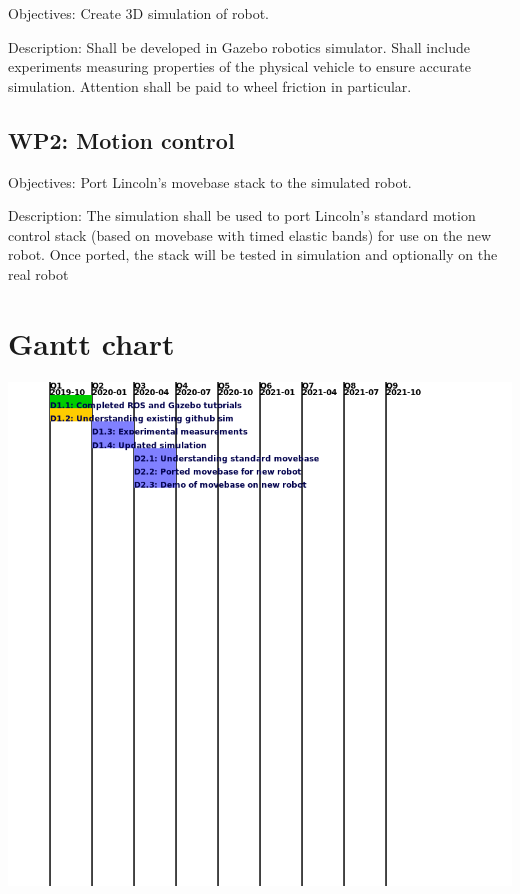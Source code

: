 \documentclass[english]{article}
\begin{document}
Objectives: Create 3D simulation of robot.

Description: Shall be developed in Gazebo robotics simulator. Shall include experiments measuring properties of the physical vehicle to ensure accurate simulation. Attention shall be paid to wheel friction in particular.

\subsection*{WP2: Motion control}

Objectives: Port Lincoln's movebase stack to the simulated robot.

Description: The simulation shall be used to port Lincoln’s standard motion
control stack (based on movebase with timed elastic bands) for use
on the new robot. Once ported, the stack will be tested in simulation
and optionally on the real robot



\newpage

\section{Gantt chart}

\includegraphics[width=16cm]{gantt.png}

\newpage
\end{document}
